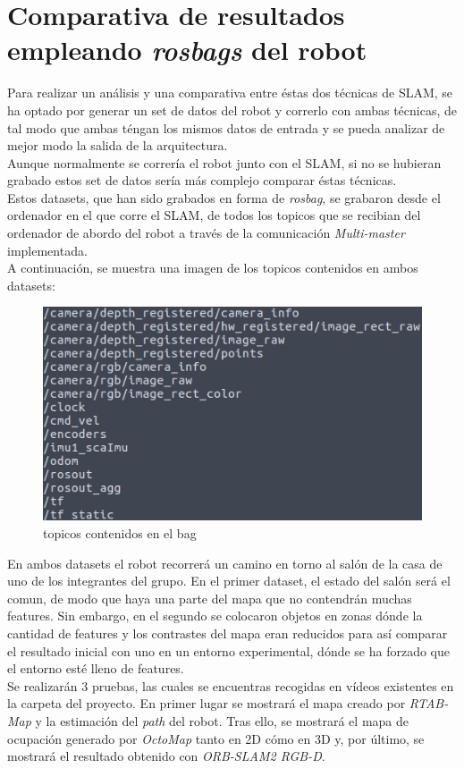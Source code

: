 \section{Comparativa de resultados empleando \textit{rosbags} del robot}
Para realizar un análisis y una comparativa entre éstas dos técnicas de SLAM, se ha optado por generar un set de datos del robot y correrlo con ambas técnicas,
de tal modo que ambas téngan los mismos datos de entrada y se pueda analizar de mejor modo la salida de la arquitectura. \\
Aunque normalmente se correría el robot junto con el SLAM, si no se hubieran grabado estos set de datos sería más complejo comparar éstas técnicas. \\
Estos datasets, que han sido grabados en forma de \textit{rosbag}, se grabaron desde el ordenador en el que corre el SLAM, de todos los topicos que se recibian
del ordenador de abordo del robot a través de la comunicación \textit{Multi-master} implementada.\\
A continuación, se muestra una imagen de los topicos contenidos en ambos datasets:
\begin{figure}[h!]
    \centering
    \includegraphics[width=.5\textwidth]{images/topics_bags}
    \caption{topicos contenidos en el bag}
\end{figure}

En ambos datasets el robot recorrerá un camino en torno al salón de la casa de uno de los integrantes del grupo. En el primer dataset, el estado del salón será 
el comun, de modo que haya una parte del mapa que no contendrán muchas features. Sin embargo, en el segundo se colocaron objetos en zonas dónde la cantidad de features
y los contrastes del mapa eran reducidos para así comparar el resultado inicial con uno en un entorno experimental, dónde se ha forzado que el entorno esté lleno de features.\\

Se realizarán 3 pruebas, las cuales se encuentras recogidas en vídeos existentes en la carpeta del proyecto. En primer lugar se mostrará el mapa creado por \textit{RTAB-Map} y
la estimación del \textit{path} del robot. Tras ello, se mostrará el mapa de ocupación generado por \textit{OctoMap} tanto en 2D cómo en 3D y, por último, se mostrará el
resultado obtenido con \textit{ORB-SLAM2 RGB-D}. \\


